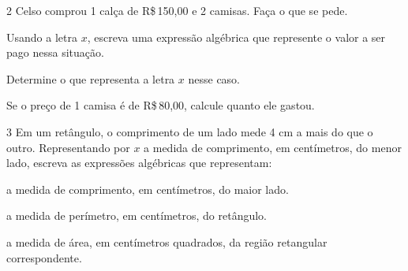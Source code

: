 




\num{2} Celso comprou 1 calça de R\$\,150,00 e 2 camisas. Faça o que se pede.

\begin{escolha}[itemsep=0pt]
\item Usando a letra $x$, escreva uma expressão algébrica que represente o valor a ser pago nessa situação.




\item Determine o que representa a letra $x$ nesse caso.


\item Se o preço de 1 camisa é de R\$\,80,00, calcule quanto ele gastou.




\end{escolha}

\num{3} Em um retângulo, o comprimento de um lado mede 4 cm a mais do que o
outro. Representando por $x$ a medida de comprimento, em centímetros, do
menor lado, escreva as expressões algébricas que representam:


\begin{escolha}[itemsep=0pt]
\item a medida de comprimento, em centímetros, do maior lado.
\item a medida de perímetro, em centímetros, do retângulo.
\item a medida de área, em centímetros quadrados, da região retangular correspondente.
\end{escolha}


